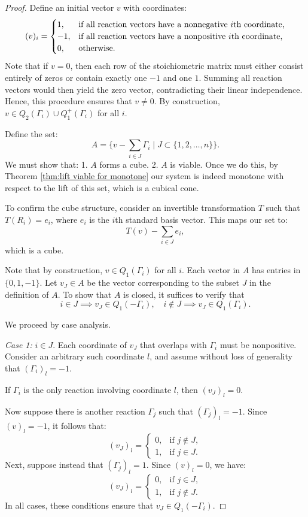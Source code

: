 \documentclass{article}
\begin{document}
\begin{proof}

Define an initial vector \( v \) with coordinates:
    \[
    (v)_i =
    \begin{cases}
        1, & \text{if all reaction vectors have a nonnegative \( i \)th coordinate,} \\
        -1, & \text{if all reaction vectors have a nonpositive \( i \)th coordinate,} \\
        0, & \text{otherwise.}
    \end{cases}
    \]
    Note that if \( v = 0 \), then each row of the stoichiometric matrix must either consist entirely of zeros or contain exactly one \(-1\) and one \(1\). Summing all reaction vectors would then yield the zero vector, contradicting their linear independence. Hence, this procedure ensures that \( v \neq 0 \). By construction, \( v \in Q_2(\Gamma_i) \cup Q_1^+(\Gamma_i) \) for all \( i \).

    Define the set:
    \[
    A = \{ v - \sum_{i \in J}  \Gamma_i \mid J \subset \{1,2,\dots,n\}
     \}.
    \]
    We must show that:
    1. \( A \) forms a cube.
    2. \( A \) is viable. Once we do this, by Theorem \ref{thm:lift viable for monotone} our system is indeed monotone with respect to the lift of this set, which is a cubical cone.

 To confirm the cube structure, consider an invertible transformation \( T \) such that \( T(R_i) = e_i \), where \( e_i \) is the \( i \)th standard basis vector. This maps our set to:
\[
 T(v) - \sum_{i \in J} e_i,
 \]
 which is a cube.


 Note that by construction, \( v \in Q_1(\Gamma_i) \) for all \( i \). Each vector in \( A \) has entries in \( \{0,1,-1\} \). Let \( v_J \in A \) be the vector corresponding to the subset \( J \) in the definition of \( A \). To show that \( A \) is closed, it suffices to verify that  
\[
i \in J \implies v_J \in Q_1(-\Gamma_i), \quad i \notin J \implies v_J \in Q_1(\Gamma_i).
\]

We proceed by case analysis.

\textit{Case 1:} \( i \in J \).  
Each coordinate of \( v_J \) that overlaps with \( \Gamma_i \) must be nonpositive. Consider an arbitrary such coordinate \( l \), and assume without loss of generality that \( (\Gamma_i)_l = -1 \).

If \( \Gamma_i \) is the only reaction involving coordinate \( l \), then \( (v_J)_l = 0 \).

Now suppose there is another reaction \( \Gamma_j \) such that \( (\Gamma_j)_l = -1 \). Since \( (v)_l = -1 \), it follows that:
\[
(v_J)_l =
\begin{cases}
0, & \text{if } j \notin J, \\
1, & \text{if } j \in J.
\end{cases}
\]
Next, suppose instead that \( (\Gamma_j)_l = 1 \). Since \( (v)_l = 0 \), we have:
\[
(v_J)_l =
\begin{cases}
0, & \text{if } j \in J, \\
1, & \text{if } j \notin J.
\end{cases}
\]
In all cases, these conditions ensure that \( v_J \in Q_1(-\Gamma_i) \).


\end{proof}
\end{document}
